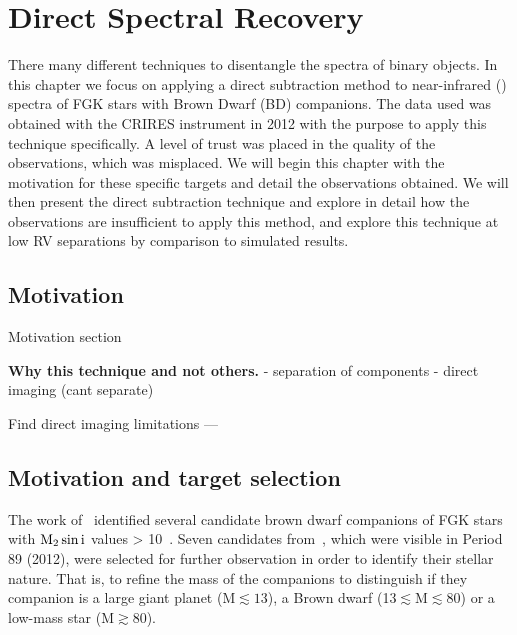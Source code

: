 

\chapter{Direct Spectral Recovery} %
\label{cha:direct_recovery}

There many different techniques to disentangle the spectra of binary objects. In this chapter we focus on applying a direct subtraction method to near-infrared (\nir{}) spectra of {FGK} stars with Brown Dwarf (BD) companions. The data used was obtained with the {CRIRES} instrument in 2012 with the purpose to apply this technique specifically. A level of trust was placed in the quality of the observations, which was misplaced. We will begin this chapter with the motivation for these specific targets and detail the observations obtained. We will then present the direct subtraction technique and explore in detail how the observations are insufficient to apply this method, and explore this technique at low RV separations by comparison to simulated results.

\section{Motivation}

Motivation section

\textbf{Why this technique and not others.}
- separation of components
- direct imaging (cant separate)


Find direct imaging limitations ---


\section{Motivation and target selection}
\label{sec:motivation}
The work of~\citet{sahlmann_search_2011} identified several candidate brown dwarf companions of FGK stars with \(\rm M_2 \sin{i}\) values > 10~\Mjup{}. Seven candidates from~\citet{sahlmann_search_2011}, which were visible in Period 89 (2012), were selected for further observation in order to identify their stellar nature. That is, to refine the mass of the companions to distinguish if they companion is a large giant planet (M$\apprle13$\Mjup), a Brown dwarf (13$\apprle $M$\apprle80$\Mjup) or a low-mass star (M$\apprge80$\Mjup).


